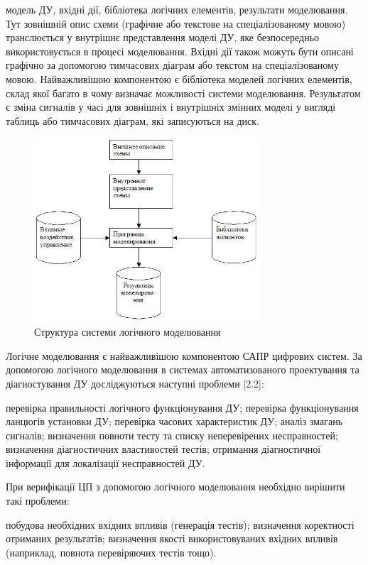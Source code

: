 \documentclass[12pt,a4paper]{article}
\begin{document}
модель ДУ,
вхідні дії,
бібліотека логічних елементів,
результати моделювання.
Тут зовнішній опис схеми (графічне або текстове на спеціалізованому мовою) транслюється у внутрішнє представлення моделі ДУ, яке безпосередньо використовується в процесі моделювання. Вхідні дії також можуть бути описані графічно за допомогою тимчасових діаграм або текстом на спеціалізованому мовою. Найважливішою компонентою є бібліотека моделей логічних елементів, склад якої багато в чому визначає можливості системи моделювання. Результатом є зміна сигналів у часі для зовнішніх і внутрішніх змінних моделі у вигляді таблиць або тимчасових діаграм, які записуються на диск.

\begin{figure}[h]
  \centering
    \includegraphics[width=0.75\textwidth]{03_01.jpg}
  \caption{Структура системи логічного моделювання\label{logicModStruct}}
\end{figure}

Логічне моделювання є найважливішою компонентою САПР цифрових систем. За допомогою логічного моделювання в системах автоматизованого проектування та діагностування ДУ досліджуються наступні проблеми [2.2]:

перевірка правильності логічного функціонування ДУ;
перевірка функціонування ланцюгів установки ДУ;
перевірка часових характеристик ДУ;
аналіз змагань сигналів;
визначення повноти тесту та списку неперевірених несправностей;
визначення діагностичних властивостей тестів;
отримання діагностичної інформації для локалізації несправностей ДУ.



При верифікації ЦП з допомогою логічного моделювання необхідно вирішити такі проблеми:

побудова необхідних вхідних впливів (генерація тестів);
визначення коректності отриманих результатів;
визначення якості використовуваних вхідних впливів (наприклад, повнота перевіряючих тестів тощо).
\end{document}
